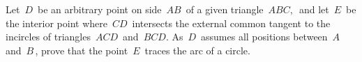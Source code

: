 Let $\, D \,$ be an arbitrary point on side $\, AB \,$ of a given triangle $\, ABC, \,$ and let $\, E \,$ be the interior point where $\, CD \,$ intersects the external common tangent to the incircles of triangles $\, ACD \,$ and $\, BCD$.  As $\, D \,$ assumes all positions between $\, A \,$ and $\, B \,$,  prove that the point $\, E \,$ traces the arc of a circle.